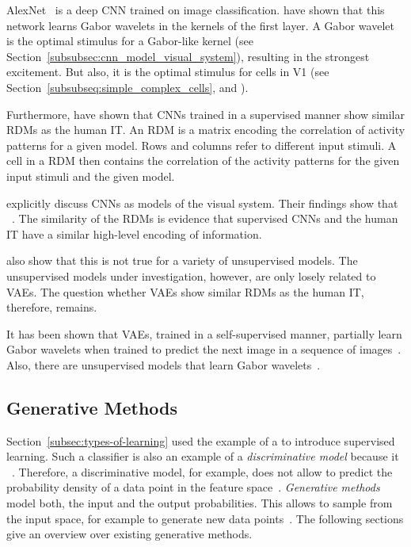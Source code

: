 AlexNet~\citep{krizhevsky2012imagenet} is a deep \ac{CNN} trained on image classification.
\citet{krizhevsky2012imagenet} have shown that this network learns Gabor wavelets in the kernels of the first layer.
A Gabor wavelet is the optimal stimulus for a Gabor-like kernel (see Section~\ref{subsubsec:cnn_model_visual_system}), resulting in the strongest excitement.
But also, it is the optimal stimulus for cells in \ac{V1} (see Section~\ref{subsubseq:simple_complex_cells}, and \citet{jones1987evaluation}).

Furthermore, \citet{khaligh2014deep} have shown that \acp{CNN} trained in a supervised manner show similar \acp{RDM} as the human \ac{IT}.
An \ac{RDM} is a matrix encoding the correlation of activity patterns for a given model.
Rows and columns refer to different input stimuli.
A cell in a \ac{RDM} then contains the correlation of the activity patterns for the given input stimuli and the given model.

\citet{eickenberg2017seeing} explicitly discuss \acp{CNN} as models of the visual system.
Their findings show that ~\citep{eickenberg2017seeing, wen2018neural}.
The similarity of the \acp{RDM} is evidence that supervised \acp{CNN} and the human \ac{IT} have a similar high-level encoding of information.

\citet{khaligh2014deep} also show that this is not true for a variety of unsupervised models.
The unsupervised models under investigation, however, are only losely related to \acfp{VAE}.
The question whether \acp{VAE} show similar \acp{RDM} as the human \ac{IT}, therefore, remains.

It has been shown that \acp{VAE}, trained in a self-supervised manner, partially learn Gabor wavelets when trained to predict the next image in a sequence of images~\citep{palm2012prediction}.
Also, there are unsupervised models that learn Gabor wavelets~\citep{berkes2005slow}.

\subsection{Generative Methods}\label{subsec:generative-methods}

Section~\ref{subsec:types-of-learning} used the example of a  to introduce supervised learning.
Such a classifier is also an example of a \textit{discriminative model} because it ~\citep[p. 43]{bishop2006pattern}.
Therefore, a discriminative model, for example, does not allow to predict the probability density of a data point in the feature space~\citep[pp. 43,44]{bishop2006pattern}.
\textit{Generative methods} model both, the input and the output probabilities.
This allows to sample from the input space, for example to generate new data points~\citep[p. 43]{bishop2006pattern}.
The following sections give an overview over existing generative methods.

